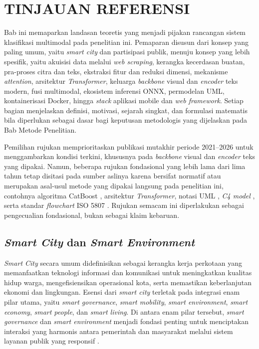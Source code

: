 \chapter{TINJAUAN REFERENSI}
\label{ch:tinjauan}

Bab ini memaparkan landasan teoretis yang menjadi pijakan rancangan sistem klasifikasi multimodal pada penelitian ini. Pemaparan disusun dari konsep yang paling umum, yaitu \textit{smart city} dan partisipasi publik, menuju konsep yang lebih spesifik, yaitu akuisisi data melalui \textit{web scraping}, kerangka kecerdasan buatan, pra-proses citra dan teks, ekstraksi fitur dan reduksi dimensi, mekanisme \textit{attention}, arsitektur \textit{Transformer}, keluarga \textit{backbone} visual dan \textit{encoder} teks modern, fusi multimodal, ekosistem inferensi ONNX, permodelan UML, kontainerisasi Docker, hingga \textit{stack} aplikasi mobile dan \textit{web framework}. Setiap bagian menjelaskan definisi, motivasi, sejarah singkat, dan formulasi matematis bila diperlukan sebagai dasar bagi keputusan metodologis yang dijelaskan pada Bab Metode Penelitian.

Pemilihan rujukan memprioritaskan publikasi mutakhir periode 2021--2026 untuk menggambarkan kondisi terkini, khususnya pada \textit{backbone} visual dan \textit{encoder} teks yang dipakai. Namun, beberapa rujukan fondasional yang lebih lama dari lima tahun tetap disitasi pada sumber aslinya karena bersifat normatif atau merupakan asal-usul metode yang dipakai langsung pada penelitian ini, contohnya algoritma CatBoost \citep{prokhorenkovaCatBoost2018}, arsitektur \textit{Transformer}, notasi UML \citep{boochUML2005}, \textit{C4 model} \citep{brownC42018}, serta standar \textit{flowchart} ISO 5807 \citep{iso5807}. Rujukan semacam ini diperlakukan sebagai pengecualian fondasional, bukan sebagai klaim kebaruan.

\section{\textit{Smart City} dan \textit{Smart Environment}}
\label{sec:smartcity}

\textit{Smart City} secara umum didefinisikan sebagai kerangka kerja perkotaan yang memanfaatkan teknologi informasi dan komunikasi untuk meningkatkan kualitas hidup warga, mengefisiensikan operasional kota, serta memastikan keberlanjutan ekonomi dan lingkungan. Esensi dari \textit{smart city} terletak pada integrasi enam pilar utama, yaitu \textit{smart governance}, \textit{smart mobility}, \textit{smart environment}, \textit{smart economy}, \textit{smart people}, dan \textit{smart living}. Di antara enam pilar tersebut, \textit{smart governance} dan \textit{smart environment} menjadi fondasi penting untuk menciptakan interaksi yang harmonis antara pemerintah dan masyarakat melalui sistem layanan publik yang responsif \citep{siretPublicComplainingBlessing2022}.

